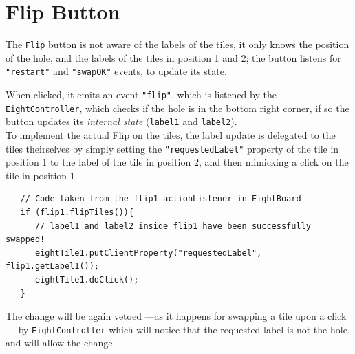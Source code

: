 
\section{Flip Button}

The \lstinline|Flip| button is not aware of the labels of the tiles, it only knows the position of the hole, and the labels of the tiles in position 1 and 2; the button listens for \lstinline|"restart"| and \lstinline|"swapOK"| events, to update its state.

When clicked, it emits an event \lstinline|"flip"|, which is listened by the \lstinline|EightController|, which checks if the hole is in the bottom right corner, if so the button updates its \textit{internal state} (\lstinline|label1| and \lstinline|label2|).\\
To implement the actual Flip on the tiles, the label update is delegated to the tiles theirselves by simply setting the \lstinline|"requestedLabel"| property of the tile in position 1 to the label of the tile in position 2, and then mimicking a click on the tile in position 1.

\begin{lstlisting}
   // Code taken from the flip1 actionListener in EightBoard
   if (flip1.flipTiles()){
      // label1 and label2 inside flip1 have been successfully swapped!
      eightTile1.putClientProperty("requestedLabel", flip1.getLabel1());
      eightTile1.doClick();
   }
\end{lstlisting}

The change will be again vetoed ---as it happens for swapping a tile upon a click--- by \lstinline|EightController| which will notice that the requested label is not the hole, and will allow the change.
